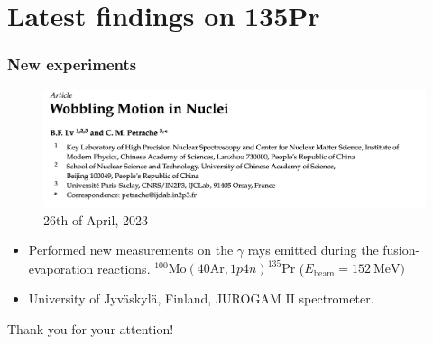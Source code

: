 \documentclass{beamer}
\begin{document}
\section{Latest findings on 135Pr}

\begin{frame}
	\frametitle{New experiments}
	\vspace{-0.4cm}
	\begin{figure}
		\centering
		\includegraphics[scale=0.28]{figures/new-wobbling-paper.pdf}
		\caption{26th of April, 2023}
	\end{figure}
	\vspace{-0.4cm}
	\begin{itemize}
		\item Performed new measurements on the $\gamma$ rays emitted during the fusion-evaporation reactions. $^{100}\text{Mo}\left(40\text{Ar},1p4n\right)^{135}\text{Pr}$ ($E_\text{beam}=152\ \text{MeV})$
		\item University of Jyväskylä, Finland, JUROGAM II spectrometer.
	\end{itemize}
\end{frame}

\begin{frame}
	\begin{center}
		\bigskip\bigskip
		{\Huge Thank you for your attention!}
	\end{center}
\end{frame} 
\end{document}

